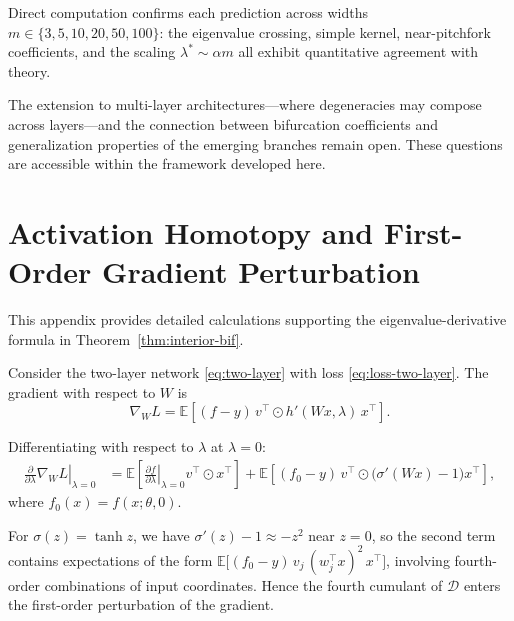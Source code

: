 \documentclass[11pt, reqno]{amsart}
\theoremstyle{plain}
\theoremstyle{definition}
\theoremstyle{remark}
\begin{document}
Direct computation confirms each prediction across widths $m \in \{3, 5, 10, 20, 50, 100\}$: the eigenvalue crossing, simple kernel, near-pitchfork coefficients, and the scaling $\lambda^*\sim\alpha m$ all exhibit quantitative agreement with theory.

The extension to multi-layer architectures---where degeneracies may compose across layers---and the connection between bifurcation coefficients and generalization properties of the emerging branches remain open.  These questions are accessible within the framework developed here.

\appendix

\section{Activation Homotopy and First-Order Gradient Perturbation}\label{app:gradient-perturbation}

This appendix provides detailed calculations supporting the eigenvalue-derivative formula in Theorem~\ref{thm:interior-bif}.

Consider the two-layer network \eqref{eq:two-layer} with loss \eqref{eq:loss-two-layer}.
The gradient with respect to $W$ is
\begin{equation}
  \nabla_W L
  =
  \mathbb E\!\left[
  (f-y)\,
  v^\top \odot h'(Wx,\lambda)\,x^\top
  \right].
\end{equation}

Differentiating with respect to $\lambda$ at $\lambda=0$:
\begin{align}
  \left.\frac{\partial}{\partial \lambda}\nabla_WL\right|_{\lambda=0}
  &=
  \mathbb E\!\left[
  \left.\frac{\partial f}{\partial\lambda}\right|_{\lambda=0}
  v^\top \odot x^\top
  \right]
  +
  \mathbb E\!\left[
  (f_0-y)\,v^\top \odot
  \bigl(\sigma'(Wx)-1\bigr)x^\top
  \right],
\end{align}
where $f_0(x)=f(x;\theta,0)$.

For $\sigma(z)=\tanh z$, we have $\sigma'(z)-1\approx -z^2$ near $z=0$, so the second term contains expectations of the form
$\mathbb E\bigl[(f_0-y)\,v_j\,(w_j^\top x)^2\, x^\top\bigr]$,
involving fourth-order combinations of input coordinates. Hence the fourth cumulant of $\mathcal D$ enters the first-order perturbation of the gradient.
\end{document}
